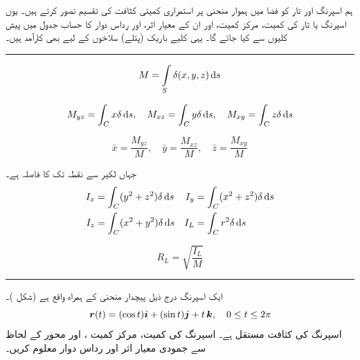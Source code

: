 ہم اسپرنگ اور تار کو فضا میں ہموار منحنی پر  استمراری کمیتی کثافت  کی تقسیم تصور کرتے ہیں۔ یوں اسپرنگ یا تار کی کمیت، مرکز کمیت، اور ان کے معیار اثر،  اور  رداس دوار کا حساب جدول  میں پیش کلیوں  سے کیا جائے گا۔ یہی کلیے  باریک (پتلے)  سلاخوں کے لیے بھی کارآمد ہیں۔ 
\begin{table}
\caption{
فضا میں ہموار منحنی  کے ہمراہ  اسپرنگ، باریک سلاخ، اور تار کی کمیت اور معیار اثر کے کلیے۔
}
\label{جدول_سمتی_میدان_کمیت_معیار_اثر}
\noindent\rule{0.9\textwidth}{\heavyrulewidth}
\begin{description}
\item
{}
\[M=\int\limits_S \delta(x,y,z) \dif s\]
\item
{}
\[M_{yz}=\int_C x\delta \dif s,\quad M_{xz}=\int_C y\delta \dif s,\quad M_{xy}=\int_Cz\delta \dif s\]
\item
{}
\[\bar{x}=\frac{M_{yz}}{M},\quad \bar{y}=\frac{M_{xz}}{M},\quad \bar{z}=\frac{M_{xy}}{M}\]
\item
{} جہاں  لکیر  سے نقطہ  تک  کا فاصلہ  ہے۔
\begin{align*}
I_x&=\int_C(y^2+z^2)\delta \dif s & I_y&=\int_C(x^2+z^2)\delta \dif s\\
I_z&=\int_C(x^2+y^2)\delta \dif s& I_L&=\int_C r^2\delta \dif s
\end{align*}
\item
{}
\[R_L=\sqrt{\frac{I_L}{M}}\]
\end{description}
\noindent\rule{0.9\textwidth}{\heavyrulewidth}
\end{table}

 
ایک اسپرنگ درج ذیل پیچدار منحنی کے ہمراہ  واقع  ہے (شکل )۔
\[{{\boldsymbol{r}}}(t)=(\cos t){\boldsymbol{i}}+(\sin t){\boldsymbol{j}}+t\,{\boldsymbol{k}},\quad 0\le t\le 2\pi\]
 اسپرنگ کی کثافت مستقل   ہے۔  اسپرنگ کی کمیت، مرکز کمیت  ، اور محور  کے لحاظ سے   جمودی معیار اثر اور رداس دوار معلوم کریں۔

